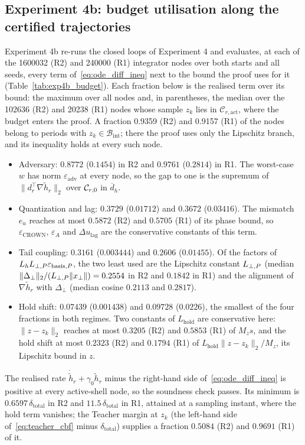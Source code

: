 \subsection{Experiment 4b: budget utilisation along the certified trajectories}
Experiment 4b re-runs the closed loops of Experiment 4 and evaluates, at each of the 1600032 (R2) and
240000 (R1) integrator nodes over both starts and all seeds, every term of~\eqref{eq:ode_diff_ineq} next to
the bound the proof uses for it (Table~\ref{tab:exp4b_budget}). Each fraction below is the realised term over its
bound: the maximum over all nodes and, in parentheses, the median over the 102636 (R2) and 20238 (R1)
nodes whose sample \(z_k\) lies in \(\mathcal C_{r,\mathrm{act}}\), where the budget enters the proof. A fraction
0.9359 (R2) and 0.9157 (R1) of the nodes belong to periods with \(z_k \in \mathcal B_{\mathrm{int}}\);
there the proof uses only the Lipschitz branch, and its inequality holds at every such node.
\begin{itemize}
\item Adversary: \(0.8772\) (\(0.1454\)) in R2 and \(0.9761\) (\(0.2814\))
in R1. The worst-case \(w\) has norm \(\varepsilon_{\mathrm{adv}}\) at every node, so the gap to one is the supremum
of \(\|d_r^\top\nabla\tilde h_r\|_2\) over \(\mathcal{C}_{r,0}\) in \(\overline d_h\).
\item Quantization and lag: \(0.3729\) (\(0.01712\)) and \(0.3672\)
(\(0.03416\)). The mismatch \(e_u\) reaches at most \(0.5872\) (R2) and \(0.5705\) (R1)
of its phase bound, so \(\varepsilon_{\mathrm{CROWN}}\), \(\varepsilon_A\) and \(\Delta u_{\mathrm{lag}}\) are the conservative constants of this term.
\item Tail coupling: \(0.3161\) (\(0.003444\)) and \(0.2606\) (\(0.01455\)).
Of the factors of \(L_hL_{\perp,P}\varepsilon_{\mathrm{basis},P}\), the two least used are the Lipschitz constant \(L_{\perp,P}\) (median
\(\|\Delta_\perp\|_2/(L_{\perp,P}\|x_\perp\|) = 0.2554\) in R2 and \(0.1842\) in R1) and the
alignment of \(\nabla\tilde h_r\) with \(\Delta_\perp\) (median cosine \(0.2113\) and \(0.2817\)).
\item Hold shift: \(0.07439\) (\(0.001438\)) and \(0.09728\) (\(0.0226\)), the
smallest of the four fractions in both regimes. Two constants of \(L_{\mathrm{hold}}\) are conservative here:
\(\|z - z_k\|_2\) reaches at most \(0.3205\) (R2) and \(0.5853\) (R1) of \(M_z s\), and the hold shift
at most \(0.2323\) (R2) and \(0.1794\) (R1) of
\(L_{\mathrm{hold}}\|z - z_k\|_2/M_z\), its Lipschitz bound in \(z\).
\end{itemize}
The realised rate \(\dot{\tilde h}_r + \gamma_0\tilde h_r\) minus the right-hand side of~\eqref{eq:ode_diff_ineq} is
positive at every active-shell node, so the soundness check passes. Its minimum is \(0.6597\,\delta_{\mathrm{total}}\)
in R2 and \(11.5\,\delta_{\mathrm{total}}\) in R1, attained at a sampling instant, where the hold term
vanishes; the Teacher margin at \(z_k\) (the left-hand side of~\eqref{eq:teacher_cbf} minus \(\delta_{\mathrm{total}}\))
supplies a fraction \(0.5084\) (R2) and \(0.9691\) (R1) of it.

